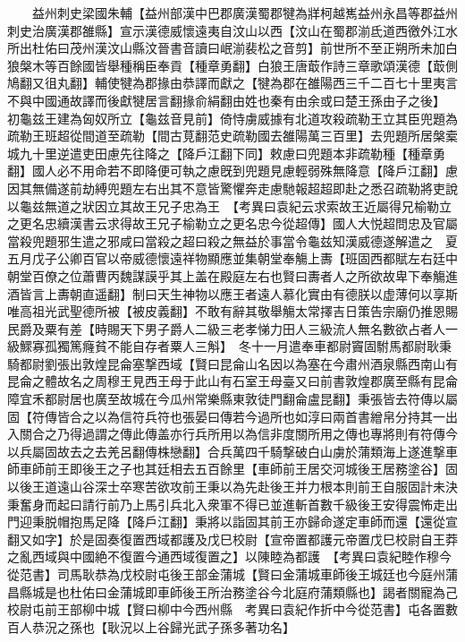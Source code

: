 　　益州刺史梁國朱輔【益州部漢中巴郡廣漢蜀郡犍為牂柯越嶲益州永昌等郡益州刺史治廣漢郡雒縣】宣示漢德威懷遠夷自汶山以西【汶山在蜀郡湔氐道西徼外江水所出杜佑曰茂州漢汶山縣汶晉書音讀曰岷湔裴松之音剪】前世所不至正朔所未加白狼槃木等百餘國皆舉種稱臣奉貢【種章勇翻】白狼王唐菆作詩三章歌頌漢德【菆側鳩翻又徂丸翻】輔使犍為郡掾由恭譯而獻之【犍為郡在雒陽西三千二百七十里夷言不與中國通故譯而後獻犍居言翻掾俞絹翻由姓也秦有由余或曰楚王孫由子之後】　初龜兹王建為匈奴所立【龜兹音見前】倚恃虜威據有北道攻殺疏勒王立其臣兜題為疏勒王班超從間道至疏勒【間古莧翻范史疏勒國去雒陽萬三百里】去兜題所居槃槖城九十里逆遣吏田慮先往降之【降戶江翻下同】敕慮曰兜題本非疏勒種【種章勇翻】國人必不用命若不即降便可執之慮旣到兜題見慮輕弱殊無降意【降戶江翻】慮因其無備遂前劫縛兜題左右出其不意皆驚懼奔走慮馳報超超即赴之悉召疏勒將吏說以龜兹無道之狀因立其故王兄子忠為王　【考異曰袁紀云求索故王近屬得兄榆勒立之更名忠續漢書云求得故王兄子榆勒立之更名忠今從超傳】國人大悦超問忠及官屬當殺兜題邪生遣之邪咸曰當殺之超曰殺之無益於事當令龜兹知漢威德遂解遣之　夏五月戊子公卿百官以帝威德懷遠祥物顯應並集朝堂奉觴上夀【班固西都賦左右廷中朝堂百僚之位蕭曹丙魏謀謨乎其上盖在殿庭左右也賢曰夀者人之所欲故卑下奉觴進酒皆言上夀朝直遥翻】制曰天生神物以應王者遠人慕化實由有德朕以虚薄何以享斯唯高祖光武聖德所被【被皮義翻】不敢有辭其敬舉觴太常擇吉日策告宗廟仍推恩賜民爵及粟有差【時賜天下男子爵人二級三老孝悌力田人三級流人無名數欲占者人一級鰥寡孤獨篤癃貧不能自存者粟人三斛】　冬十一月遣奉車都尉竇固駙馬都尉耿秉騎都尉劉張出敦煌昆侖塞撃西域【賢曰昆侖山名因以為塞在今肅州酒泉縣西南山有昆侖之體故名之周穆王見西王母于此山有石室王母臺又曰前書敦煌郡廣至縣有昆侖障宜禾都尉居也廣至故城在今瓜州常樂縣東敦徒門翻侖盧昆翻】秉張皆去符傳以屬固【符傳皆合之以為信符兵符也張晏曰傳若今過所也如淳曰兩首書繒帛分持其一出入關合之乃得過謂之傳此傳盖亦行兵所用以為信非度關所用之傳也專將則有符傳今以兵屬固故去之去羌呂翻傳株戀翻】合兵萬四千騎撃破白山虜於蒲類海上遂進撃車師車師前王即後王之子也其廷相去五百餘里【車師前王居交河城後王居務塗谷】固以後王道遠山谷深士卒寒苦欲攻前王秉以為先赴後王并力根本則前王自服固計未決秉奮身而起曰請行前乃上馬引兵北入衆軍不得已並進斬首數千級後王安得震怖走出門迎秉脱帽抱馬足降【降戶江翻】秉將以詣固其前王亦歸命遂定車師而還【還從宣翻又如字】於是固奏復置西域都護及戊巳校尉【宣帝置都護元帝置戊巳校尉自王莽之亂西域與中國絶不復置今通西域復置之】以陳睦為都護　【考異曰袁紀睦作穆今從范書】司馬耿恭為戊校尉屯後王部金蒲城【賢曰金蒲城車師後王城廷也今庭州蒲昌縣城是也杜佑曰金蒲城即車師後王所治務塗谷今北庭府蒲類縣也】謁者關寵為己校尉屯前王部柳中城【賢曰柳中今西州縣　考異曰袁紀作折中今從范書】屯各置數百人恭況之孫也【耿況以上谷歸光武子孫多著功名】

